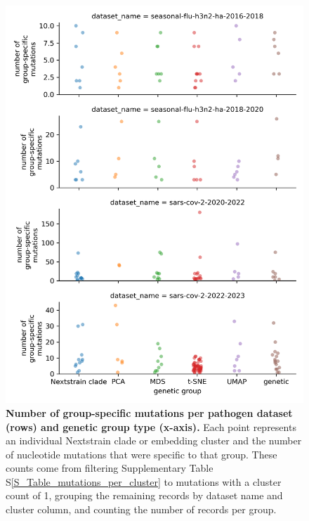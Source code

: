 \begin{figure}[!h]
\includegraphics[width=0.9\columnwidth]{figures/group-specific-mutations-per-dataset-and-genetic-group.png}
\caption{{\bf Number of group-specific mutations per pathogen dataset (rows) and genetic group type (x-axis).}
  Each point represents an individual Nextstrain clade or embedding cluster and the number of nucleotide mutations that were specific to that group.
  These counts come from filtering Supplementary Table S\ref{S_Table_mutations_per_cluster} to mutations with a cluster count of 1, grouping the remaining records by dataset name and cluster column, and counting the number of records per group.
}\label{S_Fig_group_specific_mutations}
\end{figure}

